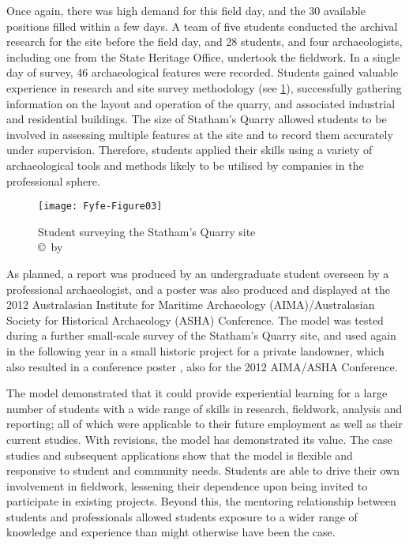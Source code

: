 	Once again, there was high demand for this field day, and the 30 available positions filled within a few days. A team of five students conducted the archival research for the site before the field day, and 28 students, and four archaeologists, including one from the State Heritage Office, undertook the fieldwork. 
	In a single day of survey, 46 archaeological features were recorded. 
	Students gained valuable experience in research and site survey methodology (see \cref{fig:Fyfe-Figure03}), successfully gathering information on the layout and operation of the quarry, and associated industrial and residential buildings. 
	The size of Statham’s Quarry allowed students to be involved in assessing multiple features at the site and to record them accurately under supervision. Therefore, students applied their skills using a variety of archaeological tools and methods likely to be utilised by companies in the professional sphere.
	
	\begin{figure}[!htb] %
		\texttt{[image: Fyfe-Figure03]}
		\caption{Student surveying the Statham's Quarry site 
		{\normalfont\scriptsize \\ \copyright\ by 
				                 \shortauthor
				                  }}
		\centering
		\label{fig:Fyfe-Figure03}
	\end{figure}
As planned, a report \parencite{murszewskiwinter2012} was produced by an undergraduate student overseen by a professional archaeologist, 
	and a poster \parencite{murszewski2012} was also produced and displayed at the 2012 Australasian Institute for Maritime Archaeology (AIMA)/Australasian Society for Historical Archaeology (ASHA) Conference. 
	The model was tested during a further small-scale survey of the Statham’s Quarry site, and used again in the following year in a small historic project for a private landowner, which also resulted in a conference poster \parencite{busher2012}, also for the 2012 AIMA/ASHA Conference.
	
	The model demonstrated that it could provide experiential learning for a large number of students with a wide range of skills in research, fieldwork, analysis and reporting; all of which were applicable to their future employment as well as their current studies. 
	With revisions, the model has demonstrated its value. The case studies and subsequent applications show that the model is flexible and responsive to student and community needs. 
	Students are able to drive their own involvement in fieldwork, lessening their dependence upon being invited to participate in existing projects. Beyond this, the mentoring relationship between students and professionals allowed students exposure to a wider range of knowledge and experience than might otherwise have been the case.
	
